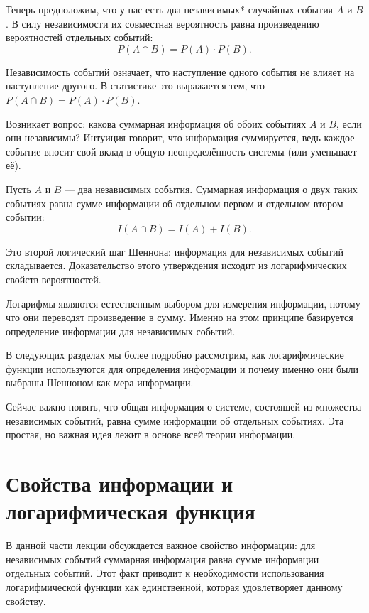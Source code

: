 \documentclass[12pt,a4paper]{article}
\newenvironment{thmbox}[1][]{%
  \begin{tcolorbox}[enhanced, breakable, colback=thmcolor, colframe=blue!50!black, title=#1, fonttitle=\bfseries, arc=3pt, boxrule=0.5pt]
}{\end{tcolorbox}}
\newenvironment{rembox}[1][]{%
  \begin{tcolorbox}[enhanced, breakable, colback=gray!5, colframe=gray!50, title=#1, fonttitle=\bfseries, arc=3pt, boxrule=0.5pt]
}{\end{tcolorbox}}
\begin{document}
Теперь предположим, что у нас есть два независимых* случайных события $A$ и $B$. В силу независимости их совместная вероятность равна произведению вероятностей отдельных событий:
\[
P(A \cap B) = P(A) \cdot P(B).
\]

\begin{rembox}[Независимость событий]
Независимость событий означает, что наступление одного события не влияет на наступление другого. В статистике это выражается тем, что $P(A \cap B) = P(A) \cdot P(B)$.
\end{rembox}

Возникает вопрос: какова суммарная информация об обоих событиях $A$ и $B$, если они независимы? Интуиция говорит, что информация суммируется, ведь каждое событие вносит свой вклад в общую неопределённость системы (или уменьшает её).

\begin{thmbox}[Сумма информации независимых событий]
Пусть $A$ и $B$ — два независимых события. Суммарная информация о двух таких событиях равна сумме информации об отдельном первом и отдельном втором событии:
\[
I(A \cap B) = I(A) + I(B).
\]
\end{thmbox}

Это второй логический шаг Шеннона: информация для независимых событий складывается. Доказательство этого утверждения исходит из логарифмических свойств вероятностей.

\begin{rembox}[Интуиция логарифмической функции]
Логарифмы являются естественным выбором для измерения информации, потому что они переводят произведение в сумму. Именно на этом принципе базируется определение информации для независимых событий.
\end{rembox}

В следующих разделах мы более подробно рассмотрим, как логарифмические функции используются для определения информации и почему именно они были выбраны Шенноном как мера информации. 

Сейчас важно понять, что общая информация о системе, состоящей из множества независимых событий, равна сумме информации об отдельных событиях. Эта простая, но важная идея лежит в основе всей теории информации.
\section{Свойства информации и логарифмическая функция}

В данной части лекции обсуждается важное свойство информации: для независимых событий суммарная информация равна сумме информации отдельных событий. Этот факт приводит к необходимости использования логарифмической функции как единственной, которая удовлетворяет данному свойству.
\end{document}
